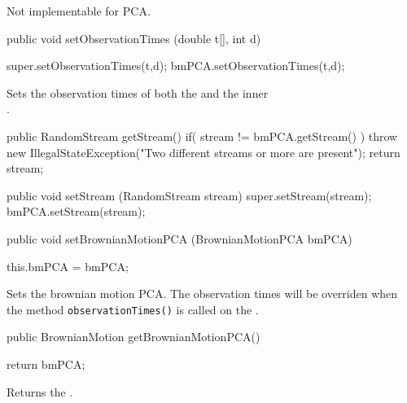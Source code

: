 \begin{tabb} Not implementable for PCA.
\end{tabb}
\begin{code}
   
   public void setObservationTimes (double t[], int d) \begin{hide} {
        super.setObservationTimes(t,d);
        bmPCA.setObservationTimes(t,d);
    }\end{hide}
\end{code}
\begin{tabb}
Sets the observation times of both the 
and the inner \\  .
\end{tabb}
\begin{code}\begin{hide}

   public RandomStream getStream() {
        if( stream != bmPCA.getStream() )
            throw new IllegalStateException("Two different streams or more are present");
        return stream;
    }


    public void setStream (RandomStream stream) {
        super.setStream(stream);
        bmPCA.setStream(stream);
    }\end{hide}

   public void setBrownianMotionPCA (BrownianMotionPCA bmPCA)\begin{hide} {
        this.bmPCA = bmPCA;
    }\end{hide}
\end{code}
\begin{tabb} Sets the brownian motion PCA.  The observation times
will be overriden when the method \texttt{observationTimes()} is called on 
the .
\end{tabb}
\begin{code}

   public BrownianMotion getBrownianMotionPCA() \begin{hide} {
        return bmPCA; 
    }\end{hide}
\end{code}
\begin{tabb} Returns the .
\end{tabb}
\begin{code}
\begin{hide}
}
\end{hide}
\end{code}
